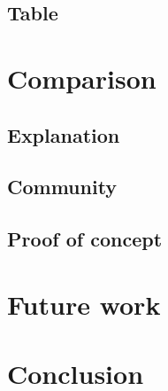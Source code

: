 \documentclass[a4paper]{article}
\begin{document}
\subsection{Table}
\label{sec:table} 

\section{Comparison} %
\label{sec:comparison}

\subsection{Explanation} %
\label{sec:explanation}

\subsection{Community} %
\label{sec:community}


\subsection{Proof of concept} %
\label{sec:poc}

\section{Future work} %
\label{sec:future_work}

\section{Conclusion} %
\label{sec:conclusion}



\end{document}
